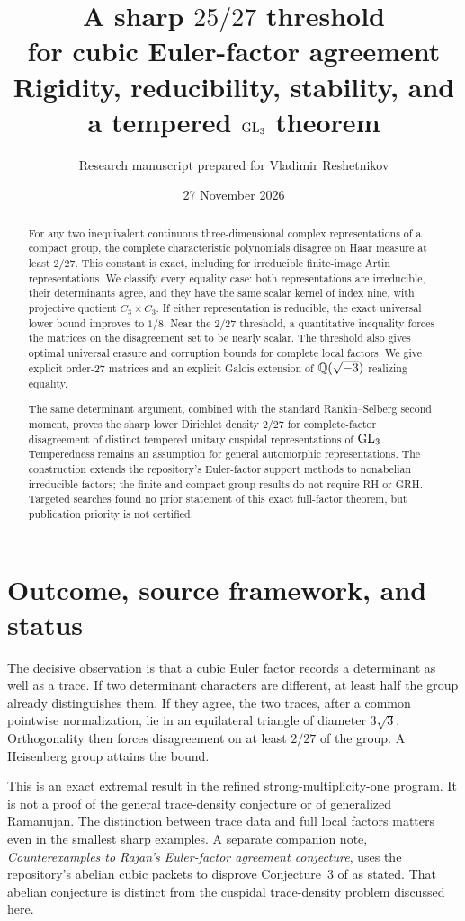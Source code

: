 \documentclass[11pt]{article}
\title{\textbf{A sharp \texorpdfstring{$25/27$}{25/27} threshold\\for cubic Euler-factor agreement}\\[5pt]\large Rigidity, reducibility, stability, and a tempered \texorpdfstring{$\mathrm{GL}_3$}{GL3} theorem}
\author{Research manuscript prepared for Vladimir Reshetnikov}
\date{27 November 2026}
\theoremstyle{definition}\newtheorem{definition}[theorem]{Definition}
\theoremstyle{remark}\newtheorem{remark}[theorem]{Remark}
\begin{document}
\maketitle
\begin{abstract}
For any two inequivalent continuous three-dimensional complex representations of a compact group, the complete characteristic polynomials disagree on Haar measure at least $2/27$. This constant is exact, including for irreducible finite-image Artin representations. We classify every equality case: both representations are irreducible, their determinants agree, and they have the same scalar kernel of index nine, with projective quotient $C_3\times C_3$. If either representation is reducible, the exact universal lower bound improves to $1/8$. Near the $2/27$ threshold, a quantitative inequality forces the matrices on the disagreement set to be nearly scalar. The threshold also gives optimal universal erasure and corruption bounds for complete local factors. We give explicit order-$27$ matrices and an explicit Galois extension of $\mathbb Q(\sqrt{-3})$ realizing equality.

The same determinant argument, combined with the standard Rankin--Selberg second moment, proves the sharp lower Dirichlet density $2/27$ for complete-factor disagreement of distinct tempered unitary cuspidal representations of $\mathrm{GL}_3$. Temperedness remains an assumption for general automorphic representations. The construction extends the repository's Euler-factor support methods to nonabelian irreducible factors; the finite and compact group results do not require RH or GRH. Targeted searches found no prior statement of this exact full-factor theorem, but publication priority is not certified.
\end{abstract}

\section{Outcome, source framework, and status}

The decisive observation is that a cubic Euler factor records a determinant as well as a trace. If two determinant characters are different, at least half the group already distinguishes them. If they agree, the two traces, after a common pointwise normalization, lie in an equilateral triangle of diameter $3\sqrt3$. Orthogonality then forces disagreement on at least $2/27$ of the group. A Heisenberg group attains the bound.

This is an exact extremal result in the refined strong-multiplicity-one program. It is not a proof of the general trace-density conjecture or of generalized Ramanujan. The distinction between trace data and full local factors matters even in the smallest sharp examples. A separate companion note, \emph{Counterexamples to Rajan's Euler-factor agreement conjecture}, uses the repository's abelian cubic packets to disprove Conjecture~3 of \cite{Rajan2000} as stated. That abelian conjecture is distinct from the cuspidal trace-density problem discussed here.
\end{document}

